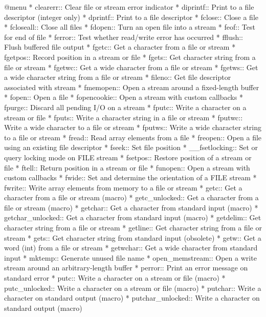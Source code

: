 @menu
* clearerr::    Clear file or stream error indicator
* diprintf::    Print to a file descriptor (integer only)
* dprintf::     Print to a file descriptor
* fclose::      Close a file
* fcloseall::   Close all files
* fdopen::      Turn an open file into a stream
* feof::        Test for end of file
* ferror::      Test whether read/write error has occurred
* fflush::      Flush buffered file output
* fgetc::       Get a character from a file or stream
* fgetpos::     Record position in a stream or file
* fgets::       Get character string from a file or stream
* fgetwc::      Get a wide character from a file or stream
* fgetws::      Get a wide character string from a file or stream
* fileno::      Get file descriptor associated with stream
* fmemopen::    Open a stream around a fixed-length buffer
* fopen::       Open a file
* fopencookie:: Open a stream with custom callbacks
* fpurge::      Discard all pending I/O on a stream
* fputc::       Write a character on a stream or file
* fputs::       Write a character string in a file or stream
* fputwc::      Write a wide character to a file or stream
* fputws::      Write a wide character string to a file or stream
* fread::       Read array elements from a file
* freopen::     Open a file using an existing file descriptor
* fseek::       Set file position
* __fsetlocking::	Set or query locking mode on FILE stream
* fsetpos::     Restore position of a stream or file
* ftell::       Return position in a stream or file
* funopen::     Open a stream with custom callbacks
* fwide::	Set and determine the orientation of a FILE stream
* fwrite::      Write array elements from memory to a file or stream
* getc::        Get a character from a file or stream (macro)
* getc_unlocked::	Get a character from a file or stream (macro)
* getchar::     Get a character from standard input (macro)
* getchar_unlocked::	Get a character from standard input (macro)
* getdelim::    Get character string from a file or stream
* getline::     Get character string from a file or stream
* gets::        Get character string from standard input (obsolete)
* getw::        Get a word (int) from a file or stream
* getwchar::    Get a wide character from standard input
* mktemp::      Generate unused file name
* open_memstream::	Open a write stream around an arbitrary-length buffer
* perror::      Print an error message on standard error
* putc::        Write a character on a stream or file (macro)
* putc_unlocked::	Write a character on a stream or file (macro)
* putchar::     Write a character on standard output (macro)
* putchar_unlocked::	Write a character on standard output (macro)
